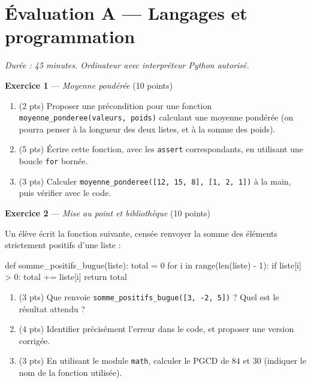 \section*{Évaluation A --- Langages et programmation}
\textit{Durée : 45 minutes. Ordinateur avec interpréteur Python autorisé.}


\bigskip

\textbf{Exercice 1} --- \textit{Moyenne pondérée} \hfill (10 points)

\begin{enumerate}
  \item (2 pts) Proposer une précondition pour une fonction \lstinline{moyenne_ponderee(valeurs, poids)} calculant une moyenne pondérée (on pourra penser à la longueur des deux listes, et à la somme des poids).
  \item (5 pts) Écrire cette fonction, avec les \lstinline{assert} correspondants, en utilisant une boucle \lstinline{for} bornée.
  \item (3 pts) Calculer \lstinline{moyenne_ponderee([12, 15, 8], [1, 2, 1])} à la main, puis vérifier avec le code.
\end{enumerate}


\bigskip

\textbf{Exercice 2} --- \textit{Mise au point et bibliothèque} \hfill (10 points)

Un élève écrit la fonction suivante, censée renvoyer la somme des éléments strictement
positifs d'une liste :
\begin{python}
def somme_positifs_bugue(liste):
    total = 0
    for i in range(len(liste) - 1):
        if liste[i] > 0:
            total += liste[i]
    return total
\end{python}

\begin{enumerate}
  \item (3 pts) Que renvoie \lstinline{somme_positifs_bugue([3, -2, 5])} ? Quel est le résultat attendu ?
  \item (4 pts) Identifier précisément l'erreur dans le code, et proposer une version corrigée.
  \item (3 pts) En utilisant le module \lstinline{math}, calculer le PGCD de $84$ et $30$ (indiquer le nom de la fonction utilisée).
\end{enumerate}

